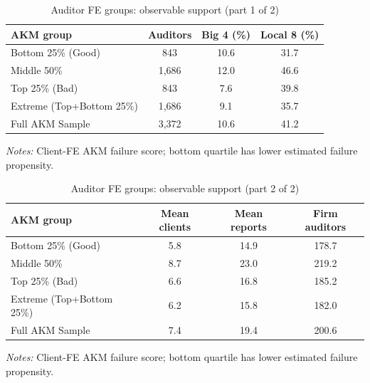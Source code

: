 \begin{table}[htbp]
\footnotesize
\centering
\caption{Auditor FE groups: observable support (part 1 of 2)}
\begin{threeparttable}
\begin{tabular}{p{}ccc}
\toprule
AKM group & Auditors & Big 4 (\%) & Local 8 (\%) \\
\midrule
Bottom 25\% (Good) & 843 & 10.6 & 31.7 \\
Middle 50\% & 1,686 & 12.0 & 46.6 \\
Top 25\% (Bad) & 843 & 7.6 & 39.8 \\
Extreme (Top+Bottom 25\%) & 1,686 & 9.1 & 35.7 \\
Full AKM Sample & 3,372 & 10.6 & 41.2 \\
\bottomrule
\end{tabular}
\begin{tablenotes}\footnotesize
\item \raggedright \textit{Notes:} Client-FE AKM failure score; bottom quartile has lower estimated failure propensity.
\end{tablenotes}
\end{threeparttable}
\end{table}

\begin{table}[htbp]
\footnotesize
\centering
\caption{Auditor FE groups: observable support (part 2 of 2)}
\begin{threeparttable}
\begin{tabular}{p{}ccc}
\toprule
AKM group & Mean clients & Mean reports & Firm auditors \\
\midrule
Bottom 25\% (Good) & 5.8 & 14.9 & 178.7 \\
Middle 50\% & 8.7 & 23.0 & 219.2 \\
Top 25\% (Bad) & 6.6 & 16.8 & 185.2 \\
Extreme (Top+Bottom 25\%) & 6.2 & 15.8 & 182.0 \\
Full AKM Sample & 7.4 & 19.4 & 200.6 \\
\bottomrule
\end{tabular}
\begin{tablenotes}\footnotesize
\item \raggedright \textit{Notes:} Client-FE AKM failure score; bottom quartile has lower estimated failure propensity.
\end{tablenotes}
\end{threeparttable}
\end{table}
